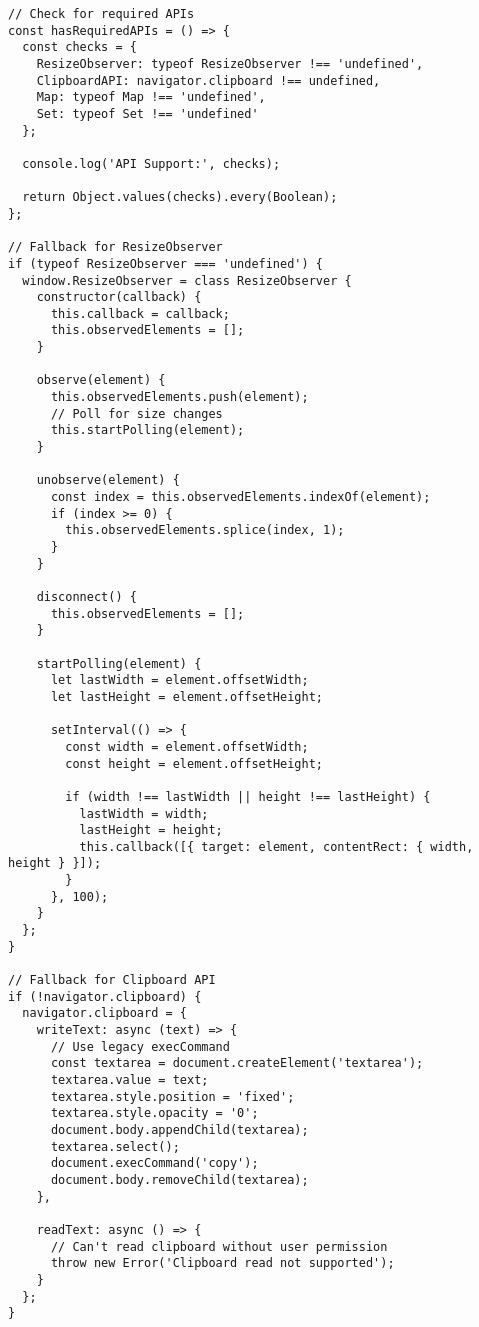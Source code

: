 \documentclass[11pt]{article}
\begin{document}
\begin{verbatim}
// Check for required APIs
const hasRequiredAPIs = () => {
  const checks = {
    ResizeObserver: typeof ResizeObserver !== 'undefined',
    ClipboardAPI: navigator.clipboard !== undefined,
    Map: typeof Map !== 'undefined',
    Set: typeof Set !== 'undefined'
  };
  
  console.log('API Support:', checks);
  
  return Object.values(checks).every(Boolean);
};

// Fallback for ResizeObserver
if (typeof ResizeObserver === 'undefined') {
  window.ResizeObserver = class ResizeObserver {
    constructor(callback) {
      this.callback = callback;
      this.observedElements = [];
    }
    
    observe(element) {
      this.observedElements.push(element);
      // Poll for size changes
      this.startPolling(element);
    }
    
    unobserve(element) {
      const index = this.observedElements.indexOf(element);
      if (index >= 0) {
        this.observedElements.splice(index, 1);
      }
    }
    
    disconnect() {
      this.observedElements = [];
    }
    
    startPolling(element) {
      let lastWidth = element.offsetWidth;
      let lastHeight = element.offsetHeight;
      
      setInterval(() => {
        const width = element.offsetWidth;
        const height = element.offsetHeight;
        
        if (width !== lastWidth || height !== lastHeight) {
          lastWidth = width;
          lastHeight = height;
          this.callback([{ target: element, contentRect: { width, height } }]);
        }
      }, 100);
    }
  };
}

// Fallback for Clipboard API
if (!navigator.clipboard) {
  navigator.clipboard = {
    writeText: async (text) => {
      // Use legacy execCommand
      const textarea = document.createElement('textarea');
      textarea.value = text;
      textarea.style.position = 'fixed';
      textarea.style.opacity = '0';
      document.body.appendChild(textarea);
      textarea.select();
      document.execCommand('copy');
      document.body.removeChild(textarea);
    },
    
    readText: async () => {
      // Can't read clipboard without user permission
      throw new Error('Clipboard read not supported');
    }
  };
}
\end{verbatim}
\end{document}
